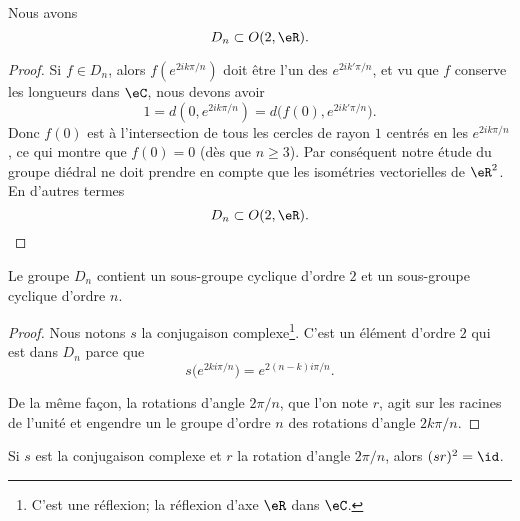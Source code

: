 \begin{lemma}       \label{LEMooCUVPooMZKnzo}
    Nous avons
    \begin{equation}
        D_n\subset O(2,\eR).
    \end{equation}
\end{lemma}

\begin{proof}
    Si \( f\in D_n\), alors \( f( e^{2ik\pi/n}) \) doit être l'un des \(  e^{2ik'\pi/n}\), et vu que \( f\) conserve les longueurs dans \( \eC\), nous devons avoir
    \begin{equation}
        1=d(0, e^{2ik\pi/n})=d\big( f(0), e^{2ik'\pi/n} \big).
    \end{equation}
    Donc \( f(0)\) est à l'intersection de tous les cercles de rayon \( 1\) centrés en les \(  e^{2ik\pi/n}\), ce qui montre que \( f(0)=0\) (dès que \( n\geq 3\)). Par conséquent notre étude du groupe diédral ne doit prendre en compte que les isométries vectorielles de \( \eR^2\). En d'autres termes
    \begin{equation}
        D_n\subset O(2,\eR).
    \end{equation}
\end{proof}

\begin{proposition}
    Le groupe \( D_n\) contient un sous-groupe cyclique d'ordre \( 2\) et un sous-groupe cyclique d'ordre \( n\).
\end{proposition}

\begin{proof}
    Nous notons \( s\) la conjugaison complexe\footnote{C'est une réflexion; la réflexion d'axe \( \eR\) dans \( \eC\).}. C'est un élément d'ordre \( 2\) qui est dans \( D_n\) parce que
    \begin{equation}    \label{EqSUshknP}
        s\big(  e^{2ki\pi/n} \big)= e^{2(n-k)i\pi/n}.
    \end{equation}

    De la même façon, la rotations d'angle \(2\pi/n\), que l'on note \( r\), agit sur les racines de l'unité et engendre un le groupe d'ordre \( n\) des rotations d'angle \(2 k\pi/n\).
\end{proof}

\begin{proposition}
    Si \( s\) est la conjugaison complexe et \( r\) la rotation d'angle \( 2\pi/n\), alors \( (sr)^2=\id\).
\end{proposition}

